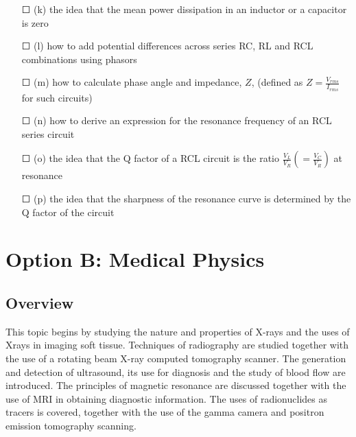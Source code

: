 \begin{itemize}
	\item[\Large{$\Square$}](k) the idea that the mean power dissipation in an inductor or a capacitor is zero
	\item[\Large{$\Square$}](l) how to add potential differences across series RC, RL and RCL combinations
	using phasors
	\item[\Large{$\Square$}](m) how to calculate phase angle and impedance, \(Z\), (defined as \( Z= \frac{V_{rms}}{I_{rms}} \) for such circuits)
	\item[\Large{$\Square$}](n) how to derive an expression for the resonance frequency of an RCL series
	circuit
	\item[\Large{$\Square$}](o) the idea that the Q factor of a RCL circuit is the ratio \( \frac{V_{L}}{V_{R}}(=\frac{V_{C}}{V_{R}}) \) at resonance
	\item[\Large{$\Square$}](p) the idea that the sharpness of the resonance curve is determined by the
	Q factor of the circuit
\end{itemize}
\newpage
\section*{Option B: Medical Physics}

\subsection*{Overview}
This topic begins by studying the nature and properties of X-rays and the uses of Xrays
in imaging soft tissue. Techniques of radiography are studied together with the
use of a rotating beam X-ray computed tomography scanner. The generation and
detection of ultrasound, its use for diagnosis and the study of blood flow are
introduced. The principles of magnetic resonance are discussed together with the
use of MRI in obtaining diagnostic information. The uses of radionuclides as tracers
is covered, together with the use of the gamma camera and positron emission
tomography scanning.


